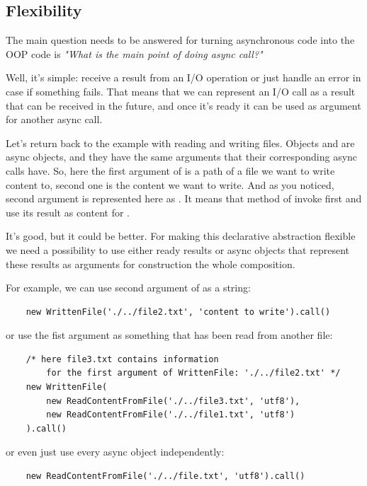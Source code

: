 \documentclass{article}
\begin{document}
\subsection{Flexibility}

The main question needs to be answered for turning asynchronous code into the OOP code is \textit{"What is the main point of doing async call?"}

Well, it's simple: receive a result from an I/O operation or just handle an error in case if something fails. That means that we can represent an I/O call as a result that can be received in the future, and once it's ready it can be used as argument for another async call.

Let's return back to the example with reading and writing files. Objects  and  are async objects, and they have the same arguments that their corresponding async calls have. So, here the first argument of  is a path of a file we want to write content to, second one is the content we want to write. And as you noticed, second argument is represented here as . It means that method  of  invoke first  and use its result as content for .

It's good, but it could be better. For making this declarative abstraction flexible we need a possibility to use either ready results or async objects that represent these results as arguments for construction the whole composition.

For example, we can use second argument of  as a string:


\begin{verbatim}
    new WrittenFile('./../file2.txt', 'content to write').call()
\end{verbatim}
or use the fist argument as something that has been read from another file:
\begin{verbatim}
    /* here file3.txt contains information 
        for the first argument of WrittenFile: './../file2.txt' */
    new WrittenFile(
        new ReadContentFromFile('./../file3.txt', 'utf8'), 
        new ReadContentFromFile('./../file1.txt', 'utf8')
    ).call()
\end{verbatim}
or even just use every async object independently:


\begin{verbatim}
    new ReadContentFromFile('./../file.txt', 'utf8').call()
\end{verbatim}
\end{document}
